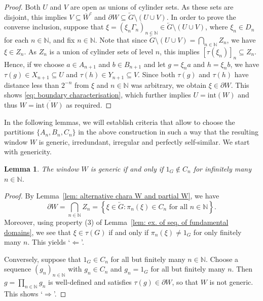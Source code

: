 \documentclass[titlepage,reqno,10pt]{amsart}
\newtheorem{lemma}[theorem]{Lemma}
\theoremstyle{definition}
\def\N{{\mathbb N}}
\begin{document}
\begin{proof}
Both $U$ and $V$ are open as unions of cylinder sets. As these sets are disjoint, this implies $V\subseteq \overline{W}^c$ and $\partial W\subseteq \overleftarrow{G}\setminus (U\cup V)$. In order to prove the converse inclusion, suppose that $\xi=(\xi_n\Gamma_n)_{n\in\mathbb{N}}\in \overleftarrow{G}\setminus (U\cup V)$, where $\xi_n\in D_n$ for each $n\in\mathbb{N}$, and fix $n\in\N$. 
Note that since $\overleftarrow{G}\setminus(U\cup V)=\bigcap_{n\in\N} Z_n$, we have $\xi\in Z_n$. 
As $Z_n$ is a union of cylinder sets of level $n$, this implies $[\tau(\xi_n)]_n\subseteq Z_n$. Hence, if we choose $a\in A_{n+1}$ and $b\in B_{n+1}$ and let 
$g=\xi_na$ and  $h=\xi_nb$, we have $\tau(g)\in X_{n+1}\subseteq U$ and $\tau(h)\in Y_{n+1} \subseteq V$. Since both $\tau(g)$ and $\tau(h)$ have distance less than $2^{-n}$ from $\xi$ and $n\in\N$ was arbitrary, we obtain $\xi\in\partial W$. This shows  \eqref{eq: boundary characterisation}, which further implies $U=\mathrm{int}(W)$ and thus $W=\overline{\mathrm{int}(W)}$ as required.   
 \end{proof}   

In the following lemmas, we will establish criteria that allow to choose the partitions $\{A_n,B_n,C_n\}$ in the above construction in such a way that the resulting window $W$ is generic, irredundant, irregular and perfectly self-similar.
We start with genericity. 

\begin{lemma}\label{genericity}
The window $W$ is generic if and only if $1_G\notin C_n$ for infinitely many $n\in\N$. 
\end{lemma}
\begin{proof}
By Lemma~\ref{lem: alternative chara W and partial W}, we have  
$$ \partial W = \bigcap_{n\in\N} Z_n  = \left\{\xi\in \overleftarrow{G}: \pi_n(\xi) \in C_n \text{ for all } n\in \N\right\}.$$
Moreover, using property (3) of Lemma~\ref{lem: ex. of seq. of fundamental domains}, we see that $\xi\in \tau(G)$ if and only if $\pi_n(\xi) \neq 1_G$ for only finitely many $n$.
This yields `$\Leftarrow$'.

Conversely, suppose that $1_G\in C_n$ for all but finitely many $n\in\N$. Choose a sequence $(g_n)_{n\in\N}$ with $g_n\in C_n$ and $g_n=1_G$ for all but finitely many $n$. Then $g=\prod_{n\in\N} g_n$ is well-defined and satisfies $\tau(g)\in\partial W$, so that $W$ is not generic. This shows `$\Rightarrow$'. 
\end{proof}
\end{document}
